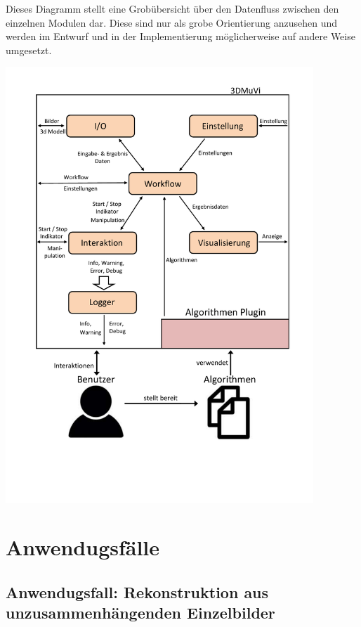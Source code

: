 Dieses Diagramm stellt eine Grobübersicht über den Datenfluss zwischen den einzelnen Modulen dar.
Diese sind nur als grobe Orientierung anzusehen und werden im Entwurf und in der Implementierung möglicherweise auf andere Weise umgesetzt.
\begin{normalsize}

\end{normalsize}
\includegraphics[width=0.87\textwidth]{img/Datenflussuebersicht.pdf} 
\newpage
 
\section{Anwendugsfälle}

\subsection{Anwendugsfall: Rekonstruktion aus unzusammenhängenden Einzelbilder}

